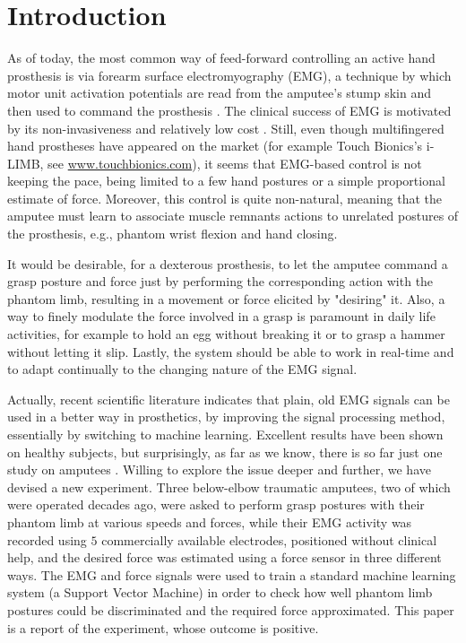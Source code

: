 \section{Introduction}
\label{sec:intro}

As of today, the most common way of feed-forward controlling an active
hand prosthesis is via forearm surface electromyography (EMG),
a technique by which motor unit activation potentials are read from the
amputee's stump skin and then used to command the prosthesis \cite{deluca97}.
The clinical success of EMG is motivated by its non-invasiveness and
relatively low cost \cite{englehart06}.
Still, even though multifingered hand prostheses have appeared on the market
(for example Touch Bionics's i-LIMB, see \url{www.touchbionics.com}),
it seems that EMG-based control is not keeping the pace, being limited to a
few hand postures or a simple proportional estimate of force.
Moreover, this control is quite non-natural, meaning that the amputee must
learn to associate muscle remnants actions to unrelated postures of the
prosthesis, e.g., phantom wrist flexion and hand closing.

It would be desirable, for a dexterous prosthesis, to let the amputee command a
grasp posture and force just by performing the corresponding action with the
phantom limb, resulting in a movement or force elicited by "desiring"
it. Also, a way to finely modulate the force involved in a grasp is paramount
in daily life activities, for example to hold an egg without breaking it or to
grasp a hammer without letting it slip. Lastly, the system should be able to
work in real-time and to adapt continually to the changing nature of the EMG
signal.

Actually, recent scientific literature indicates that plain, old EMG signals
can be used in a better way in prosthetics, by improving the signal processing
method, essentially by switching to machine learning. Excellent results have
been shown on healthy subjects, but surprisingly, as far as we know, there is
so far just one study on amputees \cite{sebelius}. Willing to explore the issue
deeper and further, we have devised a new experiment. Three below-elbow traumatic
amputees, two of which were operated decades ago, were asked to perform
grasp postures with their phantom limb at various speeds and forces, while their
EMG activity was recorded using $5$ commercially available electrodes, positioned
without clinical help, and the desired force was
estimated using a force sensor in three different ways.
The EMG and force signals were used to train a standard machine learning system
(a Support Vector Machine) in order to check how well phantom limb postures
could be discriminated and the required force approximated. This paper is
a report of the experiment, whose outcome is positive.

